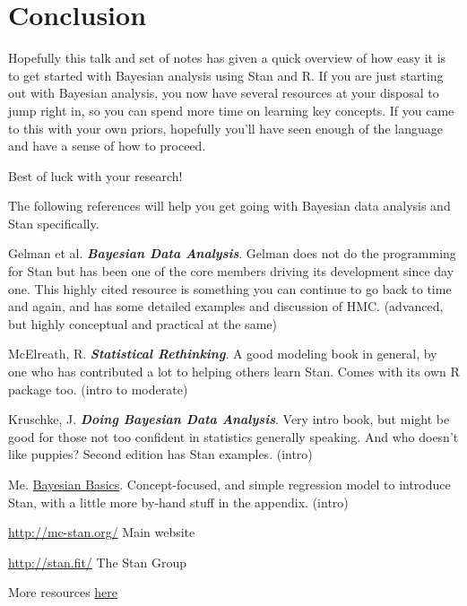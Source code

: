 \documentclass[]{book}
\begin{document}
\chapter{Conclusion}\label{conclusion}

Hopefully this talk and set of notes has given a quick overview of how
easy it is to get started with Bayesian analysis using Stan and R. If
you are just starting out with Bayesian analysis, you now have several
resources at your disposal to jump right in, so you can spend more time
on learning key concepts. If you came to this with your own priors,
hopefully you'll have seen enough of the language and have a sense of
how to proceed.

Best of luck with your research!

The following references will help you get going with Bayesian data
analysis and Stan specifically.

Gelman et al. \textbf{\emph{Bayesian Data Analysis}}. Gelman does not do
the programming for Stan but has been one of the core members driving
its development since day one. This highly cited resource is something
you can continue to go back to time and again, and has some detailed
examples and discussion of HMC. (advanced, but highly conceptual and
practical at the same)

McElreath, R. \textbf{\emph{Statistical Rethinking}}. A good modeling
book in general, by one who has contributed a lot to helping others
learn Stan. Comes with its own R package too. (intro to moderate)

Kruschke, J. \textbf{\emph{Doing Bayesian Data Analysis}}. Very intro
book, but might be good for those not too confident in statistics
generally speaking. And who doesn't like puppies? Second edition has
Stan examples. (intro)

Me. \href{http://m-clark.github.io/docs/IntroBayes.html}{Bayesian
Basics}. Concept-focused, and simple regression model to introduce Stan,
with a little more by-hand stuff in the appendix. (intro)

\url{http://mc-stan.org/} Main website

\url{http://stan.fit/} The Stan Group

More resources \href{http://mc-stan.org/documentation/}{here}


\end{document}
